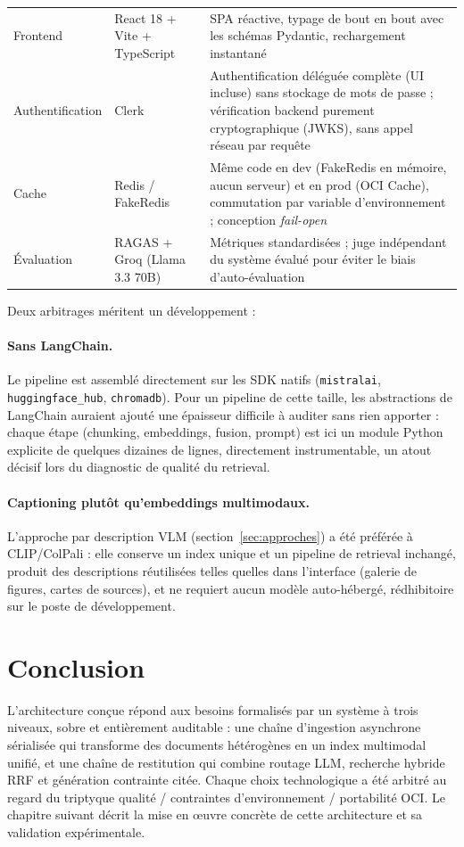 \begin{table}[!htb]
\begin{tabularx}{\textwidth}{@{}p{3.1cm}p{3.4cm}X@{}}
Frontend & React 18 + Vite + TypeScript & SPA réactive, typage de bout en bout avec les schémas Pydantic, rechargement instantané \\
Authentification & Clerk & Authentification déléguée complète (UI incluse) sans stockage de mots de passe ; vérification backend purement cryptographique (JWKS), sans appel réseau par requête \\
Cache & Redis / FakeRedis & Même code en dev (FakeRedis en mémoire, aucun serveur) et en prod (OCI Cache), commutation par variable d'environnement ; conception \emph{fail-open} \\
Évaluation & RAGAS + Groq (Llama 3.3 70B) & Métriques standardisées ; juge indépendant du système évalué pour éviter le biais d'auto-évaluation \\
\bottomrule
\end{tabularx}
\end{table}

Deux arbitrages méritent un développement :

\paragraph{Sans LangChain.} Le pipeline est assemblé directement sur les SDK natifs
(\texttt{mistralai}, \texttt{huggingface\_hub}, \texttt{chromadb}). Pour un pipeline de
cette taille, les abstractions de LangChain auraient ajouté une épaisseur difficile à
auditer sans rien apporter : chaque étape (chunking, embeddings, fusion, prompt) est ici
un module Python explicite de quelques dizaines de lignes, directement instrumentable,
un atout décisif lors du diagnostic de qualité du retrieval.

\paragraph{Captioning plutôt qu'embeddings multimodaux.} L'approche par description VLM
(section~\ref{sec:approches}) a été préférée à CLIP/ColPali : elle conserve un index
unique et un pipeline de retrieval inchangé, produit des descriptions réutilisées telles
quelles dans l'interface (galerie de figures, cartes de sources), et ne requiert aucun
modèle auto-hébergé, rédhibitoire sur le poste de développement.

\section{Conclusion}

L'architecture conçue répond aux besoins formalisés par un système à trois niveaux, sobre
et entièrement auditable : une chaîne d'ingestion asynchrone sérialisée qui transforme des
documents hétérogènes en un index multimodal unifié, et une chaîne de restitution qui
combine routage LLM, recherche hybride RRF et génération contrainte citée. Chaque choix
technologique a été arbitré au regard du triptyque qualité / contraintes d'environnement /
portabilité OCI. Le chapitre suivant décrit la mise en œuvre concrète de cette
architecture et sa validation expérimentale.
